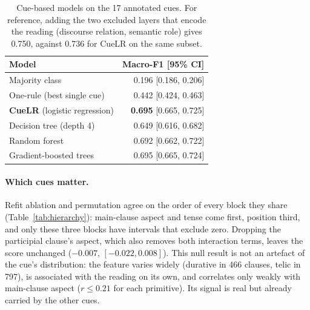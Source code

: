 \documentclass[11pt]{article}
\begin{document}
\begin{table}[t]
\centering\small
\begin{tabular}{lr}
\toprule
Model & Macro-F1 [95\% CI] \\
\midrule
Majority class & 0.196 [0.186, 0.206] \\
One-rule (best single cue) & 0.442 [0.424, 0.463] \\
\textbf{CueLR} (logistic regression) & \textbf{0.695} [0.665, 0.725] \\
Decision tree (depth 4) & 0.649 [0.616, 0.682] \\
Random forest & 0.692 [0.662, 0.722] \\
Gradient-boosted trees & 0.695 [0.665, 0.724] \\
\bottomrule
\end{tabular}
\caption{Cue-based models on the 17 annotated cues. For reference, adding the two excluded layers that encode the reading (discourse relation, semantic role) gives 0.750, against 0.736 for CueLR on the same subset.}
\label{tab:ladder}
\end{table}

\paragraph{Which cues matter.} Refit ablation and permutation agree on the order of every block they share (Table~\ref{tab:hierarchy}): main-clause aspect and tense come first, position third, and only these three blocks have intervals that exclude zero. Dropping the participial clause's aspect, which also removes both interaction terms, leaves the score unchanged ($-0.007$, $[-0.022, 0.008]$). This null result is not an artefact of the cue's distribution: the feature varies widely (durative in 466 clauses, telic in 797), is associated with the reading on its own, and correlates only weakly with main-clause aspect ($r \le 0.21$ for each primitive). Its signal is real but already carried by the other cues.
\end{document}
